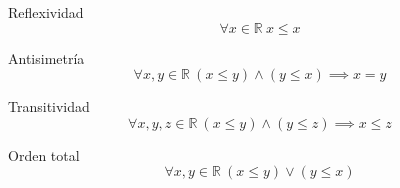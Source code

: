 
\begin{axiom} \label{real_leq_reflexive}
	Reflexividad
	\begin{equation}
		\forall x \in \mathbb{R}\ x \leq x
	\end{equation}
\end{axiom}

\begin{axiom} \label{real_leq_asymm}
	Antisimetría
	\begin{equation}
		\forall x,y \in \mathbb{R}\ (x \leq y) \land (y \leq x) \implies x = y
	\end{equation}
\end{axiom}

\begin{axiom}  \label{real_leq_trans}
	Transitividad
	\begin{equation}
		\forall x,y,z \in \mathbb{R}\ (x \leq y) \land (y \leq z) \implies x \leq z
	\end{equation}
\end{axiom}

\begin{axiom} \label{real_leq_totalorder}
	Orden total
	\begin{equation} 
		\forall x,y \in \mathbb{R}\ (x \leq y) \lor (y \leq x)
	\end{equation}
\end{axiom}
